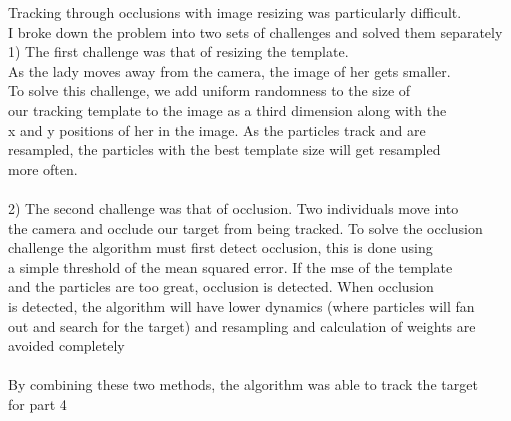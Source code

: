 Tracking through occlusions with image resizing was particularly difficult.\\
I broke down the problem into two sets of challenges and solved them separately\\
1) The first challenge was that of resizing the template.\\
As the lady moves away from the camera, the image of her gets smaller.\\
To solve this challenge, we add uniform randomness to the size of\\
our tracking template to the image as a third dimension along with the\\
x and y positions of her in the image.  As the particles track and are\\
resampled, the particles with the best template size will get resampled\\
more often.\\
\\
2) The second challenge was that of occlusion.  Two individuals move into\\
the camera and occlude our target from being tracked. To solve the occlusion\\
challenge the algorithm must first detect occlusion, this is done using\\
a simple threshold of the mean squared error.  If the mse of the  template\\
and the particles are too great, occlusion is detected. When occlusion \\
is detected, the algorithm will have lower dynamics (where particles will fan\\
out and search for the target) and resampling and calculation of weights are\\
avoided completely\\
\\
By combining these two methods, the algorithm was able to track the target\\
for part 4\\
